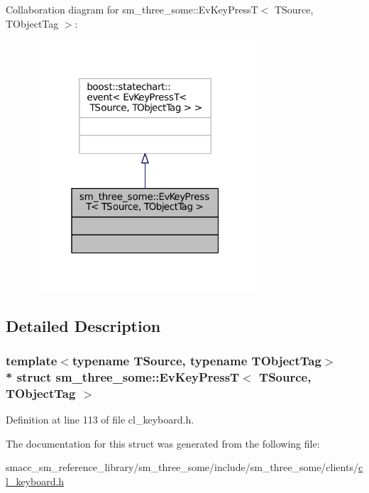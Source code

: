 Collaboration diagram for sm\+\_\+three\+\_\+some\+:\+:Ev\+Key\+PressT$<$ T\+Source, T\+Object\+Tag $>$\+:
\nopagebreak
\begin{figure}[H]
\begin{center}
\leavevmode
\includegraphics[width=235pt]{structsm__three__some_1_1EvKeyPressT__coll__graph}
\end{center}
\end{figure}


\subsection{Detailed Description}
\subsubsection*{template$<$typename T\+Source, typename T\+Object\+Tag$>$\\*
struct sm\+\_\+three\+\_\+some\+::\+Ev\+Key\+Press\+T$<$ T\+Source, T\+Object\+Tag $>$}



Definition at line 113 of file cl\+\_\+keyboard.\+h.



The documentation for this struct was generated from the following file\+:\begin{DoxyCompactItemize}
\item 
smacc\+\_\+sm\+\_\+reference\+\_\+library/sm\+\_\+three\+\_\+some/include/sm\+\_\+three\+\_\+some/clients/\hyperlink{cl__keyboard_8h}{cl\+\_\+keyboard.\+h}\end{DoxyCompactItemize}
